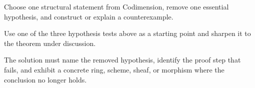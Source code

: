 \begin{exercise}\label{exr:vi31-expand-16}
Choose one structural statement from Codimension, remove one essential hypothesis, and construct or explain a counterexample.
\end{exercise}
\begin{hint}
Use one of the three hypothesis tests above as a starting point and sharpen it to the theorem under discussion.
\end{hint}
\begin{solution}
The solution must name the removed hypothesis, identify the proof step that fails, and exhibit a concrete ring, scheme, sheaf, or morphism where the conclusion no longer holds.
\end{solution}

